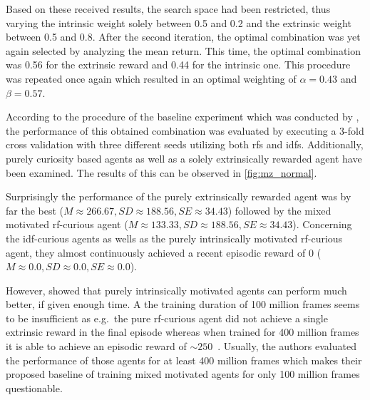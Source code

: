 \documentclass[draft,final]{vutinfth} %
\begin{document}
    Based on these received results, the search space had been restricted, thus varying the intrinsic weight solely between 0.5 and 0.2 and the extrinsic weight between 0.5 and 0.8.
    After the second iteration, the optimal combination was yet again selected by analyzing the mean return.
    This time, the optimal combination was 0.56 for the extrinsic reward and 0.44 for the intrinsic one.
    This procedure was repeated once again which resulted in an optimal weighting of $\alpha=0.43$ and $\beta=0.57$.

    According to the procedure of the baseline experiment which was conducted by \citet{burda_large-scale_2018-1}, the performance of this obtained combination was evaluated by executing a 3-fold cross validation with three different seeds utilizing both \glspl{rf} and \glspl{idf}.
    Additionally, purely curiosity based agents as well as a solely extrinsically rewarded agent have been examined.
    The results of this can be observed in \autoref{fig:mz_normal}.

    Surprisingly the performance of the purely extrinsically rewarded agent was by far the best ($M\approx266.67,SD\approx188.56,SE\approx34.43$) followed by the mixed motivated \gls{rf}-curious agent ($M\approx133.33,SD\approx188.56,SE\approx34.43$).
    Concerning the \gls{idf}-curious agents as wells as the purely intrinsically motivated \gls{rf}-curious agent, they almost continuously achieved a recent episodic reward of 0 ($M\approx0.0,SD\approx0.0,SE\approx0.0$).

    However, \citet{burda_large-scale_2018-1} showed that purely intrinsically motivated agents can perform much better, if given enough time.
    A the training duration of 100 million frames seems to be insufficient as e.g.\ the pure \gls{rf}-curious agent did not achieve a single extrinsic reward in the final episode whereas when trained for 400 million frames it is able to achieve an episodic reward of $\sim250$~\citep[compare Figure 2]{burda_large-scale_2018-1}.
    Usually, the authors evaluated the performance of those agents for at least 400 million frames which makes their proposed baseline of training mixed motivated agents for only 100 million frames questionable.
\end{document}
